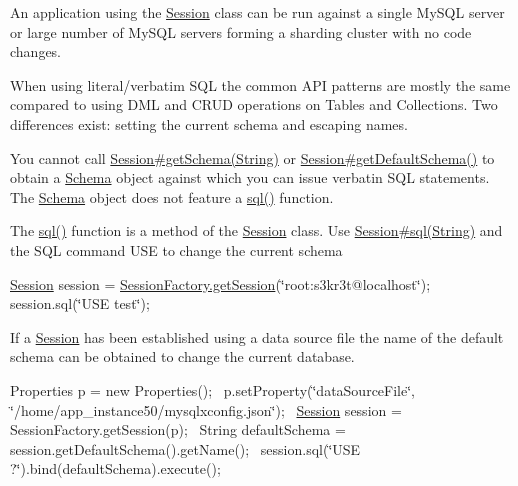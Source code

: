 An application using the \mbox{\hyperlink{interfacecom_1_1mysql_1_1cj_1_1xdevapi_1_1_session}{Session}} class can be run against a single My\+S\+QL server or large number of My\+S\+QL servers forming a sharding cluster with no code changes. 

When using literal/verbatim S\+QL the common A\+PI patterns are mostly the same compared to using D\+ML and C\+R\+UD operations on Tables and Collections. Two differences exist\+: setting the current schema and escaping names. 

You cannot call \mbox{\hyperlink{interfacecom_1_1mysql_1_1cj_1_1xdevapi_1_1_session_a70703d4853bdfee2b32da36a27fa2e52}{Session\#get\+Schema(\+String)}} or \mbox{\hyperlink{interfacecom_1_1mysql_1_1cj_1_1xdevapi_1_1_session_a8ead4f7e01e906447c15d9e6ce38ead2}{Session\#get\+Default\+Schema()}} to obtain a \mbox{\hyperlink{interfacecom_1_1mysql_1_1cj_1_1xdevapi_1_1_schema}{Schema}} object against which you can issue verbatin S\+QL statements. The \mbox{\hyperlink{interfacecom_1_1mysql_1_1cj_1_1xdevapi_1_1_schema}{Schema}} object does not feature a \mbox{\hyperlink{interfacecom_1_1mysql_1_1cj_1_1xdevapi_1_1_session_a4409e5c0f5917851f9875342b8d38b18}{sql()}} function. 

The \mbox{\hyperlink{interfacecom_1_1mysql_1_1cj_1_1xdevapi_1_1_session_a4409e5c0f5917851f9875342b8d38b18}{sql()}} function is a method of the \mbox{\hyperlink{interfacecom_1_1mysql_1_1cj_1_1xdevapi_1_1_session}{Session}} class. Use \mbox{\hyperlink{interfacecom_1_1mysql_1_1cj_1_1xdevapi_1_1_session_a4409e5c0f5917851f9875342b8d38b18}{Session\#sql(\+String)}} and the S\+QL command U\+SE to change the current schema 

\mbox{\hyperlink{interfacecom_1_1mysql_1_1cj_1_1xdevapi_1_1_session}{Session}} session = \mbox{\hyperlink{classcom_1_1mysql_1_1cj_1_1xdevapi_1_1_session_factory_a3fda3a0cf7e75e290606aa778a8ed3ef}{Session\+Factory.\+get\+Session}}(\char`\"{}root\+:s3kr3t@localhost\char`\"{});~\newline
 session.\+sql(\char`\"{}\+U\+S\+E test\char`\"{}); 

If a \mbox{\hyperlink{interfacecom_1_1mysql_1_1cj_1_1xdevapi_1_1_session}{Session}} has been established using a data source file the name of the default schema can be obtained to change the current database. 

Properties p = new Properties();~\newline
 p.\+set\+Property(\char`\"{}data\+Source\+File\char`\"{}, \char`\"{}/home/app\+\_\+instance50/mysqlxconfig.\+json\char`\"{});~\newline
 \mbox{\hyperlink{interfacecom_1_1mysql_1_1cj_1_1xdevapi_1_1_session}{Session}} session = Session\+Factory.\+get\+Session(p);~\newline
 String default\+Schema = session.\+get\+Default\+Schema().get\+Name();~\newline
 session.\+sql(\char`\"{}\+U\+S\+E ?\char`\"{}).bind(default\+Schema).execute();~\newline
 


